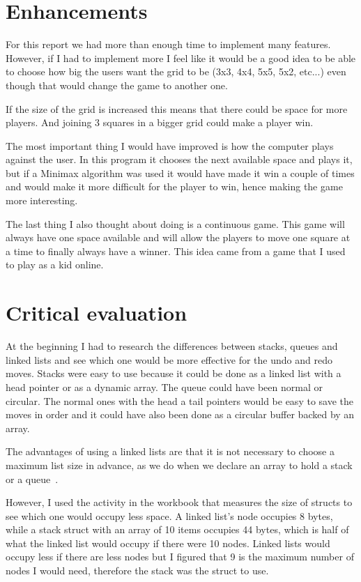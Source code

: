 \documentclass[10pt, a4paper]{article}
\begin{document}
	\section{Enhancements}

For this report we had more than enough time to implement many features. However, if I had to implement more I feel like it would be a good idea to be able to choose how big the users want the grid to be (3x3, 4x4, 5x5, 5x2, etc...) even though that would change the game to another one.

If the size of the grid is increased this means that there could be space for more players. And joining 3 squares in a bigger grid could make a player win.

The most important thing I would have improved is how the computer plays against the user. In this program it chooses the next available space and plays it, but if a Minimax algorithm was used it would have made it win a couple of times and would make it more difficult for the player to win, hence making the game more interesting.

The last thing I also thought about doing is a continuous game. This game will always have one space available and will allow the players to move one square at a time to finally always have a winner. This idea came from a game that I used to play as a kid online.

	\section{Critical evaluation}

At the beginning I had to research the differences between stacks, queues and linked lists and see which one would be more effective for the undo and redo moves. Stacks were easy to use because it could be done as a linked list with a head pointer or as a dynamic array. The queue could have been normal or circular. The normal ones with the head a tail pointers would be easy to save the moves in order and it could have also been done as a circular buffer backed by an array.

The advantages of using a linked lists are that it is not necessary to choose a maximum list size in advance, as we do when we declare an array to hold a stack or a queue~\cite{storer_2013}.

However, I used the activity in the workbook that measures the size of structs to see which one would occupy less space. A linked list's node occupies 8 bytes, while a stack struct with an array of 10 items occupies 44 bytes, which is half of what the linked list would occupy if there were 10 nodes. Linked lists would occupy less if there are less nodes but I figured that 9 is the maximum number of nodes I would need, therefore the stack was the struct to use.
\end{document}
